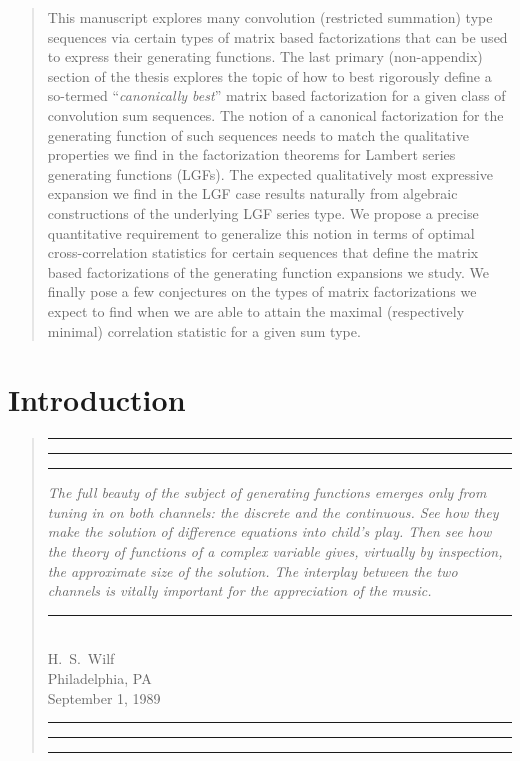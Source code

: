 \documentclass[12pt,reqno,a4letter]{article}
\numberwithin{figure}{section}
\numberwithin{table}{section}
\numberwithin{equation}{section}
\theoremstyle{plain}
\numberwithin{theorem}{section}
\theoremstyle{definition}
\begin{document}
\newpage
{}
\renewcommand{\abstractname}{Abstract}
\vspace*{\fill}
\begin{abstract}
\linespread{1.25}\normalsize
This manuscript explores many convolution (restricted summation) type sequences 
via certain types of matrix based factorizations that can be used to express their 
generating functions. 
The last primary (non-appendix) section of the thesis 
explores the topic of how to best rigorously define a so-termed ``\emph{canonically best}'' 
matrix based factorization for a given class of convolution sum sequences. 
The notion of a canonical factorization for the generating function of such sequences needs to 
match the qualitative properties we find in the factorization theorems for 
Lambert series generating functions (LGFs). The expected qualitatively most 
expressive expansion we find in the LGF case results naturally from algebraic constructions 
of the underlying LGF series type. We propose a precise quantitative requirement to generalize 
this notion in terms of optimal cross-correlation statistics for certain sequences that 
define the matrix based factorizations of the generating function expansions we study. 
We finally pose a few conjectures on the types of matrix factorizations we expect to 
find when we are able to attain the maximal (respectively minimal) 
correlation statistic for a given sum type. 
\end{abstract}
\vspace*{\fill}

\newpage
\renewcommand{\thepage}{\arabic{page}}
\label{page_LastPageOfDocumentFrontMatterCount}
\pagestyle{plain}
\setcounter{page}{1}   %

\section{Introduction} 
\label{Section_Intro}

\begin{quote}
\hrule\hrule\hrule\bigskip
{\it The full beauty of the subject of generating functions emerges only from tuning in on both channels: 
	the discrete and the continuous. See how they make the solution of difference equations into child’s 
	play. Then see how the theory of functions of a complex variable gives, virtually by inspection, the 
	approximate size of the solution. The interplay between the two channels is vitally important for the 
	appreciation of the music.} \\
	\rule{0.9\textwidth}{1.5pt}\medskip \\ 
	{\large H.~S.~Wilf} \\ 
	{\large Philadelphia, PA} \\ 
	{\large September 1, 1989} \\
\hrule\hrule\hrule
\end{quote}
\end{document}
